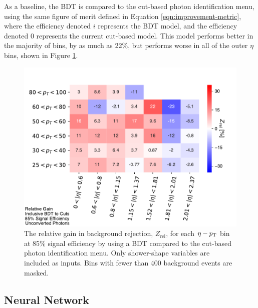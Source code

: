 As a baseline, the \gls{BDT} is compared to the cut-based photon identification menu, using the same figure of merit defined in Equation \ref{eqn:improvement-metric}, where the efficiency denoted $i$ represents the \gls{BDT} model, and the efficiency denoted $0$ represents the current cut-based model. This model performs better in the majority of bins, by as much as 22\%, but performs worse in all of the outer $\eta$ bins, shown in Figure \ref{fig:gain-bdt-vs-cuts}.
\begin{figure}[!th]
    \centering
    \includegraphics[width=.85\textwidth]{chapters/chapter4_photonID/images/gain_BDTinclusive_cuts_unconverted.pdf}
    \caption[The relative gain in background rejection, $Z_{\text{rel}}$, for each $\eta-\pt$ bin at 85\% signal efficiency by using a \gls{BDT} compared to the cut-based photon identification menu]
    {The relative gain in background rejection, $Z_{\text{rel}}$, for each $\eta-\pt$ bin at 85\% signal efficiency by using a \gls{BDT} compared to the cut-based photon identification menu. Only shower-shape variables are included as inputs. Bins with fewer than 400 background events are masked.}
    \label{fig:gain-bdt-vs-cuts}
\end{figure}


\subsection{Neural Network}\label{ssec:yid-nn}

